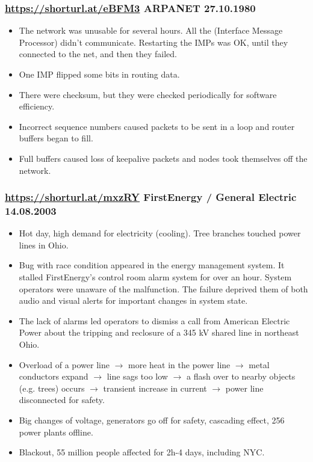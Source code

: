 \documentclass[handout]{beamer}
\begin{document}
 \begin{frame}
	\frametitle{
		\href{https://shorturl.at/eBFM3}{https://shorturl.at/eBFM3}
		 ARPANET
		 27.10.1980
	 }
	 \begin{itemize}
		\item The network was unusable for several hours. All the  (Interface Message Processor) didn't communicate. Restarting the IMPs was OK, until they connected to the net, and then they failed. \pause
		\item One IMP flipped some bits in routing data. \pause
		\item There were checksum, but they were checked periodically for software efficiency.\pause
		\item Incorrect sequence numbers caused packets to be sent in a loop and router buffers began to fill.\pause
		\item Full buffers caused loss of keepalive packets and nodes took themselves off the network. 
	\end{itemize}
 \end{frame}

 \begin{frame}
	\frametitle{
		\href{https://shorturl.at/mxzRY}{https://shorturl.at/mxzRY}
		 FirstEnergy / General Electric
		 14.08.2003
	 }
	\begin{itemize}
		\item Hot day, high demand for electricity (cooling). Tree branches touched power lines in Ohio. \pause
		\item Bug with race condition appeared in the energy management system. It stalled FirstEnergy's control room alarm system for over an hour. System operators were unaware of the malfunction. The failure deprived them of both audio and visual alerts for important changes in system state. \pause
		\item The lack of alarms led operators to dismiss a call from American Electric Power about the tripping and reclosure of a 345 kV shared line in northeast Ohio. \pause
		\item Overload of a power line $\to$ more heat in the power line $\to$ metal conductors expand $\to$ line sags too low $\to$ a flash over to nearby objects (e.g. trees) occurs $\to$ transient increase in current $\to$ power line disconnected for safety. \pause
		\item Big changes of voltage, generators go off for safety, cascading effect, 256 power plants offline. \pause
		\item Blackout, 55 million people affected for 2h-4 days, including NYC.
	\end{itemize}
 \end{frame}
\end{document}

